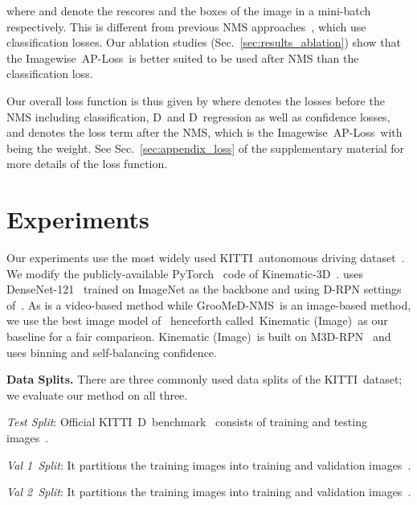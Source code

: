 \documentclass[final]{cvpr}
\newcommand{\myReferSection}[1]{Sec.~\ref{#1}}
\newcommand{\methodName}{GrooMeD-NMS}
\newcommand{\kinematicImage}{Kinematic (Image)}
\newcommand{\twoD}{D}
\newcommand{\threeD}{D}
\newcommand{\ap}{AP}
\newcommand{\aploss}{\ap-Loss}
\newcommand{\imageWise}{Imagewise}
\newcommand{\kitti}{KITTI}
\newcommand{\valOne}{Val 1}
\newcommand{\valTwo}{Val 2}
\begin{document}
            where  and  denote the rescores and the boxes of the  image in a mini-batch respectively. This is different from previous NMS approaches~\cite{hosang2016convnet, henderson2016end, prokudin2017learning, hosang2017learning}, which use classification losses. Our ablation studies (\myReferSection{sec:results_ablation}) show that the \imageWise~\aploss~is better suited to be used after NMS than the classification loss.
    
            Our overall loss function is thus given by  where  denotes the losses before the NMS including classification, \twoD~and \threeD~regression as well as confidence losses, and  denotes the loss term after the NMS, which is the \imageWise~\aploss~with  being the weight. 
            See \myReferSection{sec:appendix_loss} of the supplementary material for more details of the loss function.



\section{Experiments}\label{sec:experiments}

    Our experiments use the most widely used \kitti~autonomous driving dataset~\cite{geiger2012we}. 
    We modify the publicly-available PyTorch~\cite{paszke2019pytorch} code of Kinematic-3D~\cite{brazil2020kinematic}.
    \cite{brazil2020kinematic} uses DenseNet-121~\cite{huang2017densely} trained on ImageNet as the backbone and  using \threeD-RPN settings of~\cite{brazil2019m3d}. 
    As \cite{brazil2020kinematic} is a video-based method while \methodName~is an image-based method, we use the best image model of~\cite{brazil2020kinematic} henceforth called~\kinematicImage~as our baseline for a fair comparison.
    \kinematicImage~is built on M3D-RPN~\cite{brazil2019m3d} and uses binning and self-balancing confidence. 

\noindent\textbf{Data Splits.}
        There are three commonly used data splits of the \kitti~dataset; we evaluate our method on all three.
    
        \textit{Test Split}: Official \kitti~\threeD~benchmark~\cite{kitti2012benchmark}
        consists of  training and  testing images~\cite{geiger2012we}.
        
        \textit{\valOne~Split}: It partitions the  training images into  training and  validation images~\cite{chen20153d,simonelli2020disentangling, brazil2020kinematic}.
        
        \textit{\valTwo~Split}: It partitions the  training images into  training and  validation images~\cite{xiang2017subcategory}.
    
\end{document}
